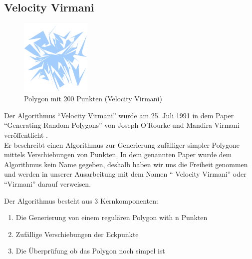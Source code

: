 \subsection{Velocity Virmani}

  \begin{figure}[h]
    \begin{center}
      \includegraphics[width=0.3\textwidth]{img/virmani200.eps}
    \end{center}
    \caption{Polygon mit 200 Punkten (Velocity Virmani)}
    \label{fig:virmani200}
  \end{figure}

  Der Algorithmus \enquote{Velocity Virmani} wurde am 25. Juli 1991 in dem 
  Paper \enquote{Generating Random Polygons} von Joseph O'Rourke und Mandira 
  Virmani veröffentlicht \cite{virmani91polygons}.\smallskip \\ 
  Er beschreibt einen Algorithmus zur Generierung zufälliger simpler 
  Polygone mittels Verschiebungen von Punkten. In dem genannten Paper wurde 
  dem Algorithmus kein Name gegeben, deshalb haben wir uns die Freiheit 
  genommen und werden in unserer Ausarbeitung mit dem Namen \enquote{
  Velocity Virmani} oder \enquote{Virmani} darauf verweisen.

  Der Algorithmus besteht aus 3 Kernkomponenten:
  \begin{enumerate}
    \item Die Generierung von einem regulären Polygon with n Punkten
    \item Zufällige Verschiebungen der Eckpunkte
    \item Die Überprüfung ob das Polygon noch simpel ist
  \end{enumerate}

